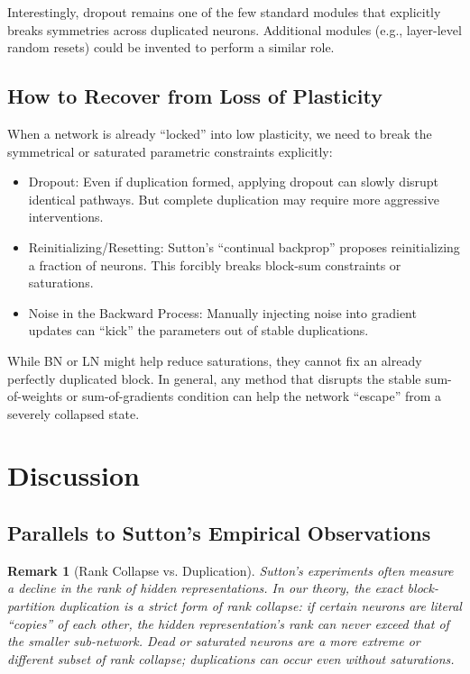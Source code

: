 \documentclass[11pt]{article}
\newtheorem{remark}{Remark}[section]
\begin{document}
Interestingly, dropout remains one of the few standard modules that explicitly breaks symmetries across duplicated neurons. Additional modules (e.g., layer-level random resets) could be invented to perform a similar role.

\subsection{How to Recover from Loss of Plasticity}
When a network is already ``locked'' into low plasticity, we need to break the symmetrical or saturated parametric constraints explicitly:
\begin{itemize}
    \item Dropout: Even if duplication formed, applying dropout can slowly disrupt identical pathways. But complete duplication may require more aggressive interventions.
    \item Reinitializing/Resetting: Sutton's ``continual backprop'' proposes reinitializing a fraction of neurons. This forcibly breaks block-sum constraints or saturations.
    \item Noise in the Backward Process: Manually injecting noise into gradient updates can ``kick'' the parameters out of stable duplications.
\end{itemize}
While BN or LN might help reduce saturations, they cannot fix an already perfectly duplicated block. In general, any method that disrupts the stable sum-of-weights or sum-of-gradients condition can help the network ``escape'' from a severely collapsed state.

\section{Discussion}

\subsection{Parallels to Sutton's Empirical Observations}

\begin{remark}[Rank Collapse vs. Duplication]
Sutton's experiments often measure a decline in the rank of hidden representations. In our theory, the exact block-partition duplication is a strict form of rank collapse: if certain neurons are literal ``copies'' of each other, the hidden representation's rank can never exceed that of the smaller sub-network. Dead or saturated neurons are a more extreme or different subset of rank collapse; duplications can occur even without saturations.
\end{remark}
\end{document}
